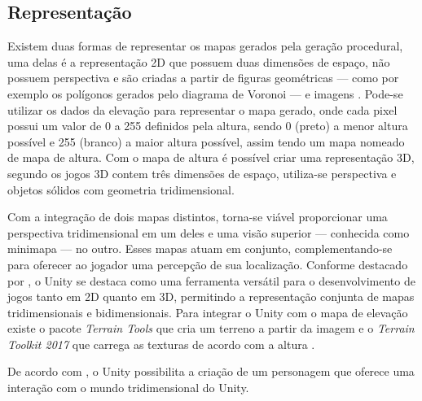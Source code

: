 \subsection{Representação}
\label{subsec:representacao}

Existem duas formas de representar os mapas gerados pela geração procedural, uma delas é a representação 2D que possuem duas dimensões de espaço, não possuem perspectiva e são criadas a partir de figuras geométricas — como por exemplo os polígonos gerados pelo diagrama de Voronoi — e imagens \cite{unitywebpage}. Pode-se utilizar os dados da elevação para representar o mapa gerado, onde cada pixel possui um valor de 0 a 255 definidos pela altura, sendo 0 (preto) a menor altura possível e 255 (branco) a maior altura possível, assim tendo um mapa nomeado de mapa de altura. Com o mapa de altura é possível criar uma representação 3D, segundo  os jogos 3D contem três dimensões de espaço, utiliza-se perspectiva e objetos sólidos com geometria tridimensional.

Com a integração de dois mapas distintos, torna-se viável proporcionar uma perspectiva tridimensional em um deles e uma visão superior — conhecida como minimapa — no outro. Esses mapas atuam em conjunto, complementando-se para oferecer ao jogador uma percepção de sua localização. Conforme destacado por , o Unity se destaca como uma ferramenta versátil para o desenvolvimento de jogos tanto em 2D quanto em 3D, permitindo a representação conjunta de mapas tridimensionais e bidimensionais. Para integrar o Unity com o mapa de elevação existe o pacote \textit{Terrain Tools} que cria um terreno a partir da imagem e o \textit{Terrain Toolkit 2017} que carrega as texturas de acordo com a altura \cite{unity-terrain-tools, unity-terrain-toolkit}.

De acordo com , o Unity possibilita a criação de um personagem que oferece uma interação com o mundo tridimensional do Unity.